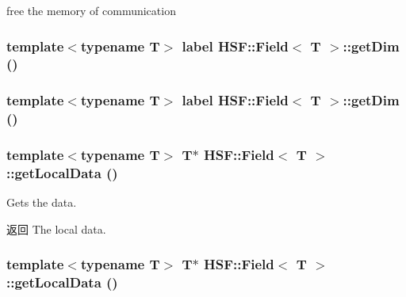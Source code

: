 free the memory of communication \hypertarget{classHSF_1_1Field_a2e8e21702b089d3ab3d41fa24353f31d}{
\subsubsection[{getDim}]{\setlength{\rightskip}{0pt plus 5cm}template$<$typename T$>$ label {\bf HSF::Field}$<$ T $>$::getDim ()}}
\label{classHSF_1_1Field_a2e8e21702b089d3ab3d41fa24353f31d}
\hypertarget{classHSF_1_1Field_a2e8e21702b089d3ab3d41fa24353f31d}{
\subsubsection[{getDim}]{\setlength{\rightskip}{0pt plus 5cm}template$<$typename T$>$ label {\bf HSF::Field}$<$ T $>$::getDim ()}}
\label{classHSF_1_1Field_a2e8e21702b089d3ab3d41fa24353f31d}
\hypertarget{classHSF_1_1Field_a737e777234950a28e98c42aebbdc8f32}{
\subsubsection[{getLocalData}]{\setlength{\rightskip}{0pt plus 5cm}template$<$typename T$>$ T$\ast$ {\bf HSF::Field}$<$ T $>$::getLocalData ()}}
\label{classHSF_1_1Field_a737e777234950a28e98c42aebbdc8f32}


Gets the data. \begin{DoxyReturn}{返回}
The local data. 
\end{DoxyReturn}
\hypertarget{classHSF_1_1Field_a737e777234950a28e98c42aebbdc8f32}{
\subsubsection[{getLocalData}]{\setlength{\rightskip}{0pt plus 5cm}template$<$typename T$>$ T$\ast$ {\bf HSF::Field}$<$ T $>$::getLocalData ()}}
\label{classHSF_1_1Field_a737e777234950a28e98c42aebbdc8f32}


